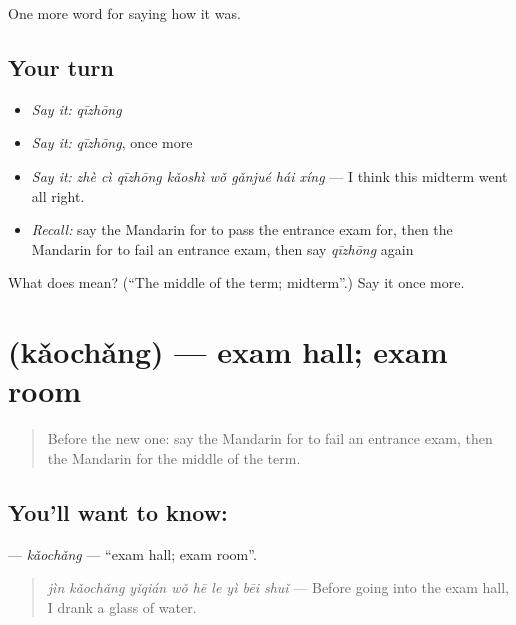 \begin{grammarlens}[title={What you've built}]
One more word for saying how it was.
\end{grammarlens}

\subsection*{Your turn}
\begin{itemize}
\raggedright
  \item \emph{Say it:} \emph{qīzhōng}
  \item \emph{Say it:} \emph{qīzhōng}, once more
  \item \emph{Say it:} \emph{zhè cì qīzhōng kǎoshì wǒ gǎnjué hái xíng} — I think this midterm went all right.
  \item \emph{Recall:} say the Mandarin for to pass the entrance exam for, then the Mandarin for to fail an entrance exam, then say \emph{qīzhōng} again
\end{itemize}

\begin{tcolorbox}[breakable,colback=teal!4,colframe=teal!35!black,title={Before you move on}]
What does  mean? (\textquotedblleft{}The middle of the term; midterm\textquotedblright{}.) Say it once more.
\end{tcolorbox}
\section[\texorpdfstring{\zh{考场} (kǎochǎng)}{考场 (kǎochǎng)}]{ (kǎochǎng) — exam hall; exam room}

\label{lesson:ZH-C495-kaochang}



\begin{quote}
Before the new one: say the Mandarin for to fail an entrance exam, then the Mandarin for the middle of the term.
\end{quote}

\subsection*{You'll want to know: }
\textbf{} — \emph{kǎochǎng} — \textquotedblleft{}exam hall; exam room\textquotedblright{}.

\begin{quote}
\textbf{} \emph{jìn kǎochǎng yǐqián wǒ hē le yì bēi shuǐ} — Before going into the exam hall, I drank a glass of water.
\end{quote}

